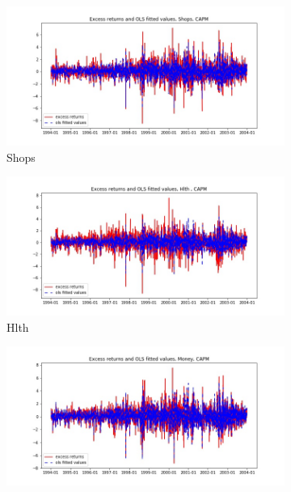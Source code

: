 \documentclass{article}
\begin{document}
\begin{figure}
  
  \begin{subfigure}[b]{0.5\textwidth}
    \centering
    \includegraphics[width=\textwidth]{Shops/fitted_CAPM.jpg}
    \caption{Shops}
    \label{fig:2}
  \end{subfigure}
  \begin{subfigure}[b]{0.5\textwidth}
    \centering
    \includegraphics[width=\textwidth]{Hlth/fitted_CAPM.jpg}
    \caption{Hlth}
    \label{fig:2}
  \end{subfigure}
  \begin{subfigure}[b]{0.5\textwidth}
    \centering
    \includegraphics[width=\textwidth]{Money/fitted_CAPM.jpg}

\end{subfigure}
\end{figure}
\end{document}
